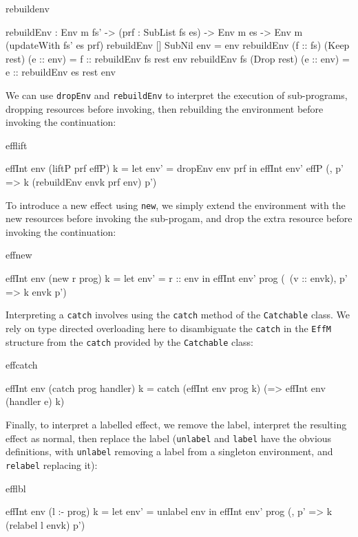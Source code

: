 \begin{SaveVerbatim}{rebuildenv}

rebuildEnv : Env m fs' -> (prf : SubList fs es) -> 
             Env m es -> Env m (updateWith fs' es prf) 
rebuildEnv []        SubNil      env = env
rebuildEnv (f :: fs) (Keep rest) (e :: env) 
      = f :: rebuildEnv fs rest env
rebuildEnv fs        (Drop rest) (e :: env) 
      = e :: rebuildEnv es rest env

\end{SaveVerbatim}

\noindent
We can use \texttt{dropEnv} and \texttt{rebuildEnv} to interpret the execution
of sub-programs, dropping resources before invoking, then rebuilding the
environment before invoking the continuation:

\begin{SaveVerbatim}{efflift}

effInt env (liftP prf effP) k 
  = let env' = dropEnv env prf in 
        effInt env' effP (\envk, p' => 
              k (rebuildEnv envk prf env) p')

\end{SaveVerbatim}

\noindent
To introduce a new effect using \texttt{new}, we simply extend the environment
with the new resources before invoking the sub-progam, and drop the extra
resource before invoking the continuation:

\begin{SaveVerbatim}{effnew}

effInt env (new r prog) k 
     = let env' = r :: env in 
           effInt env' prog 
               (\ (v :: envk), p' => k envk p')

\end{SaveVerbatim}

\noindent
Interpreting a \texttt{catch} involves using the \texttt{catch} method of
the \texttt{Catchable} class. We rely on type directed overloading here to
disambiguate the \texttt{catch} in the \texttt{EffM} structure from the
\texttt{catch} provided by the \texttt{Catchable} class:

\begin{SaveVerbatim}{effcatch}

effInt env (catch prog handler) k 
     = catch (effInt env prog k)
             (\e => effInt env (handler e) k)

\end{SaveVerbatim}

\noindent
Finally, to interpret a labelled effect, we remove the label, interpret the
resulting effect as normal, then replace the label (\texttt{unlabel} and
\texttt{label} have the obvious definitions, with \texttt{unlabel} removing
a label from a singleton environment, and \texttt{relabel} replacing it):

\begin{SaveVerbatim}{efflbl}

effInt env (l :- prog) k 
   = let env' = unlabel env in
         effInt env' prog (\envk, p' => 
                              k (relabel l envk) p')
\end{SaveVerbatim}

